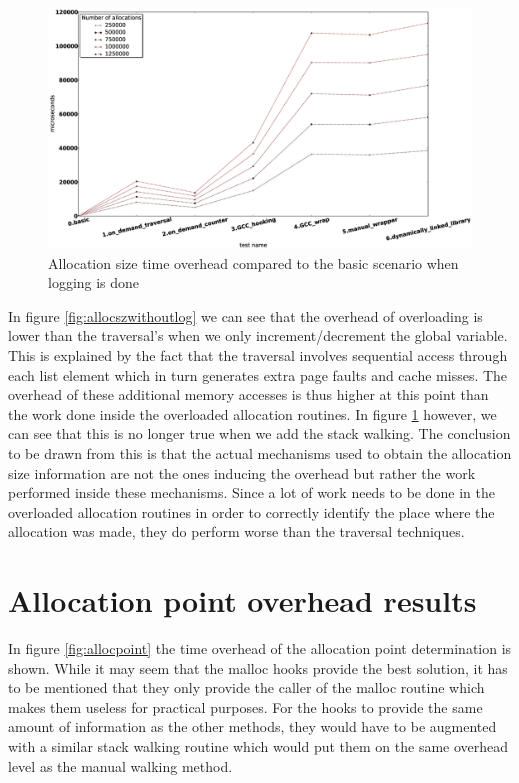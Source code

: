 \begin{figure}[htb]
\centering
\includegraphics[scale=0.5, width=\textwidth]{src/img/allocationsizewithlogging}
\caption{Allocation size time overhead compared to the basic scenario when logging is done}
\label{fig:allocszwithlog}
\end{figure}

In figure \ref{fig:allocszwithoutlog} we can see that the overhead of overloading is lower than the traversal's when we only increment/decrement the global variable. This is explained by the fact that the traversal involves sequential access through each list element which in turn generates extra page faults and cache misses. The overhead of these additional memory accesses is thus higher at this point than the work done inside the overloaded allocation routines. In figure \ref{fig:allocszwithlog} however, we can see that this is no longer true when we add the stack walking. The conclusion to be drawn from this is that the actual mechanisms used to obtain the allocation size information are not the ones inducing the overhead but rather the work performed inside these mechanisms. Since a lot of work needs to be done in the overloaded allocation routines in order to correctly identify the place where the allocation was made, they do perform worse than the traversal techniques.

\section{Allocation point overhead results}
\label{section:allocpt}

In figure \ref{fig:allocpoint} the time overhead of the allocation point determination is shown. While it may seem that the malloc hooks provide the best solution, it has to be mentioned that they only provide the caller of the malloc routine which makes them useless for practical purposes. For the hooks to provide the same amount of information as the other methods, they would have to be augmented with a similar stack walking routine which would put them on the same overhead level as the manual walking method.

